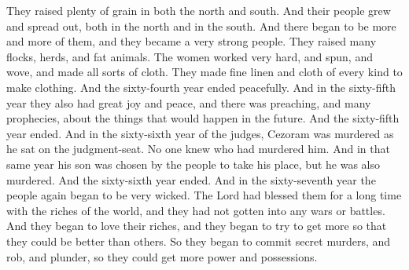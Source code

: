 They raised plenty of grain in both the north and south. And their people grew and spread out, both in the north and in the south. And there began to be more and more of them, and they became a very strong people. They raised many flocks, herds, and fat animals.
\bverse \iffalse Behold their women did toil and spin, and did make all manner of cloth, of fine-twined linen and cloth of every kind, to clothe their nakedness. And thus the sixty and fourth year did pass away in peace. \fi
The women worked very hard, and spun, and wove, and made all sorts of cloth. They made fine linen and cloth of every kind to make clothing. And the sixty-fourth year ended peacefully.
\bverse \iffalse And in the sixty and fifth year they did also have great joy and peace, yea, much preaching and many prophecies concerning that which was to come. And thus passed away the sixty and fifth year. \fi
And in the sixty-fifth year they also had great joy and peace, and there was preaching, and many prophecies, about the things that would happen in the future. And the sixty-fifth year ended.
\bverse \iffalse And it came to pass that in the sixty and sixth year of the reign of the judges, behold, Cezoram was murdered by an unknown hand as he sat upon the judgment-seat. And it came to pass that in the same year, that his son, who had been appointed by the people in his stead, was also murdered. And thus ended the sixty and sixth year. \fi
And in the sixty-sixth year of the judges, Cezoram was murdered as he sat on the judgment-seat. No one knew who had murdered him. And in that same year his son was chosen by the people to take his place, but he was also murdered. And the sixty-sixth year ended.
\bverse \iffalse And in the commencement of the sixty and seventh year the people began to grow exceedingly wicked again. \fi
And in the sixty-seventh year the people again began to be very wicked.
\bverse \iffalse For behold, the Lord had blessed them so long with the riches of the world that they had not been stirred up to anger, to wars, nor to bloodshed; therefore they began to set their hearts upon their riches; yea, they began to seek to get gain that they might be lifted up one above another; therefore they began to commit secret murders, and to rob and to plunder, that they might get gain. \fi
The Lord had blessed them for a long time with the riches of the world, and they had not gotten into any wars or battles. And they began to love their riches, and they began to try to get more so that they could be better than others. So they began to commit secret murders, and rob, and plunder, so they could get more power and possessions.
